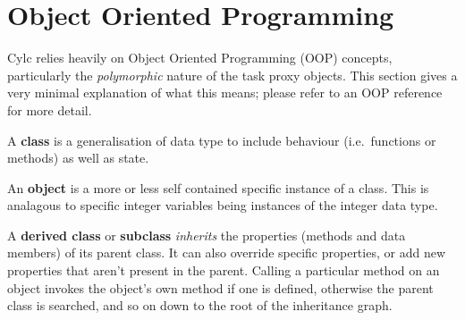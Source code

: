 \documentclass[11pt,a4paper]{article}
\begin{document}
\lstset{language=cylctaskdef}

{

}

\lstset{language=}



\pagebreak
\appendix

\section{Object Oriented Programming}
\label{ObjectOrientedProgramming}

Cylc relies heavily on Object Oriented Programming (OOP) concepts,
particularly the {\em polymorphic} nature of the task proxy objects.
This section gives a very minimal explanation of what this means;
please refer to an OOP reference for more detail.

A {\bf class} is a generalisation of data type to include behaviour
(i.e.\ functions or methods) as well as state. 


An {\bf object} is a more or less self contained specific instance
of a class. This is analagous to specific integer variables being 
instances of the integer data type.

A {\bf derived class} or {\bf subclass} {\em inherits} the properties
(methods and data members) of its parent class. It can also override
specific properties, or add new properties that aren't present in the
parent. Calling a particular method on an object invokes the object's
own method if one is defined, otherwise the parent class is searched,
and so on down to the root of the inheritance graph. 

\end{document}
